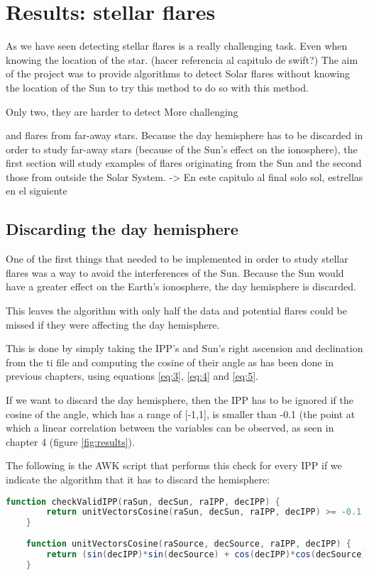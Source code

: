 \chapter{Results: stellar flares}

As we have seen detecting stellar flares is a really challenging task. Even when knowing the location of the star. (hacer referencia al capitulo de swift?) The aim of the project was to provide algorithms to detect Solar flares without knowing the location of the Sun to try this method  to do so with this method. 


Only two, they are harder to detect
More challenging

and flares from far-away stars. Because the day hemisphere has to be discarded in order to study far-away stars (because of the Sun's effect on the ionosphere), the first section will study examples of flares originating from the Sun and the second those from outside the Solar System. -> En este capitulo al final solo sol, estrellas en el siguiente

\section{Discarding the day hemisphere}

One of the first things that needed to be implemented in order to study stellar flares was a way to avoid the interferences of the Sun. Because the Sun would have a greater effect on the Earth's ionosphere, the day hemisphere is discarded.

This leaves the algorithm with only half the data and potential flares could be missed if they were affecting the day hemisphere.

This is done by simply taking the IPP's and Sun's right ascension and declination from the ti file and computing the cosine of their angle as has been done in previous chapters, using equations \ref{eq:3}, \ref{eq:4} and \ref{eq:5}.

If we want to discard the day hemisphere, then the IPP has to be ignored if the cosine of the angle, which has a range of [-1,1], is smaller than -0.1 (the point at which a linear correlation between the variables can be observed, as seen in chapter 4 (figure \ref{fig:results}).

The following is the AWK script that performs this check for every IPP if we indicate the algorithm that it has to discard the hemisphere:

\begin{minipage}{\linewidth}
	\begin{lstlisting}[language=awk, caption=Discarding the day hemisphere]
	function checkValidIPP(raSun, decSun, raIPP, decIPP) {
		return unitVectorsCosine(raSun, decSun, raIPP, decIPP) >= -0.1
	}
	
	function unitVectorsCosine(raSource, decSource, raIPP, decIPP) {
		return (sin(decIPP)*sin(decSource) + cos(decIPP)*cos(decSource)*cos(raIPP - raSource));
	}
\end{lstlisting}
\end{minipage}

